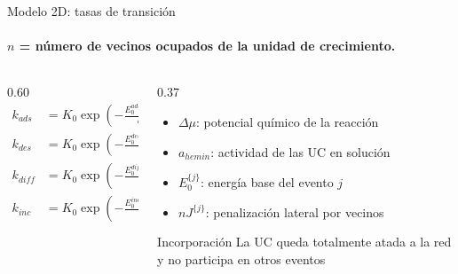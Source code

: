\documentclass[aspectratio=169,11pt]{beamer}
\newcommand{\kB}{k_{B}}
\begin{document}
\begin{frame}{Modelo 2D: tasas de transición}
  \framesubtitle{$n$ = número de vecinos ocupados de la unidad de crecimiento.}
  \begin{columns}[c,onlytextwidth]
    \begin{column}{0.60\textwidth}
      \small
      \begin{align}
        k_{ads}  &= K_0\exp\!\left(-\frac{E_0^{ads}-\Delta\mu}{\kB T}\right) a_{hemin} \tag{12}\\[0.2em]
        k_{des}  &= K_0\exp\!\left(-\frac{E_0^{des}+nJ^{des}}{\kB T}\right) \tag{13}\\[0.2em]
        k_{diff} &= K_0\exp\!\left(-\frac{E_0^{diff}+nJ^{diff}}{\kB T}\right) \tag{14}\\[0.2em]
        k_{inc}  &= K_0\exp\!\left(-\frac{E_0^{inc}+nJ^{inc}}{\kB T}\right) \tag{15}
      \end{align}
    \end{column}
    \begin{column}{0.37\textwidth}
      \small
      \begin{itemize}\setlength{\itemsep}{0.35em}
        \item $\Delta\mu$: potencial químico de la reacción
        \item $a_{hemin}$: actividad de las UC en solución
        \item $E_0^{\{j\}}$: energía base del evento $j$
        \item $nJ^{\{j\}}$: penalización lateral por vecinos
      \end{itemize}
      \vspace{0.3em}
      \begin{block}{Incorporación}
        \footnotesize La UC queda totalmente atada a la red y no participa en otros eventos
      \end{block}
    \end{column}
  \end{columns}
\end{frame}
\end{document}

